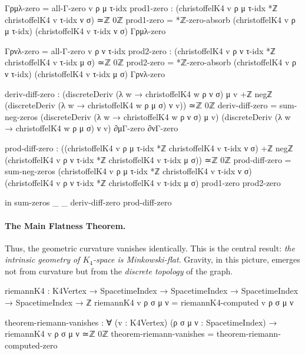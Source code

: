 \documentclass[11pt,a4paper]{book}
\begin{document}
\begin{code}
      Γρμλ-zero = all-Γ-zero v ρ μ τ-idx
      prod1-zero : (christoffelK4 v ρ μ τ-idx *ℤ christoffelK4 v τ-idx ν σ) ≃ℤ 0ℤ
      prod1-zero = *ℤ-zero-absorb (christoffelK4 v ρ μ τ-idx) 
                                   (christoffelK4 v τ-idx ν σ) Γρμλ-zero
      
      Γρνλ-zero = all-Γ-zero v ρ ν τ-idx
      prod2-zero : (christoffelK4 v ρ ν τ-idx *ℤ christoffelK4 v τ-idx μ σ) ≃ℤ 0ℤ
      prod2-zero = *ℤ-zero-absorb (christoffelK4 v ρ ν τ-idx)
                                   (christoffelK4 v τ-idx μ σ) Γρνλ-zero
      
      deriv-diff-zero : (discreteDeriv (λ w → christoffelK4 w ρ ν σ) μ v +ℤ 
                         negℤ (discreteDeriv (λ w → christoffelK4 w ρ μ σ) ν v)) ≃ℤ 0ℤ
      deriv-diff-zero = sum-neg-zeros 
                          (discreteDeriv (λ w → christoffelK4 w ρ ν σ) μ v)
                          (discreteDeriv (λ w → christoffelK4 w ρ μ σ) ν v)
                          ∂μΓ-zero ∂νΓ-zero
      
      prod-diff-zero : ((christoffelK4 v ρ μ τ-idx *ℤ christoffelK4 v τ-idx ν σ) +ℤ
                        negℤ (christoffelK4 v ρ ν τ-idx *ℤ christoffelK4 v τ-idx μ σ)) ≃ℤ 0ℤ
      prod-diff-zero = sum-neg-zeros
                         (christoffelK4 v ρ μ τ-idx *ℤ christoffelK4 v τ-idx ν σ)
                         (christoffelK4 v ρ ν τ-idx *ℤ christoffelK4 v τ-idx μ σ)
                         prod1-zero prod2-zero
      
  in sum-zeros _ _ deriv-diff-zero prod-diff-zero
\end{code}

\paragraph{The Main Flatness Theorem.}

Thus, the geometric curvature vanishes identically. This is the central result: \emph{the 
intrinsic geometry of $K_4$-space is Minkowski-flat}. Gravity, in this picture, emerges 
not from curvature but from the \emph{discrete topology} of the graph.

\begin{code}
riemannK4 : K4Vertex → SpacetimeIndex → SpacetimeIndex → 
            SpacetimeIndex → SpacetimeIndex → ℤ
riemannK4 v ρ σ μ ν = riemannK4-computed v ρ σ μ ν

theorem-riemann-vanishes : ∀ (v : K4Vertex) (ρ σ μ ν : SpacetimeIndex) →
  riemannK4 v ρ σ μ ν ≃ℤ 0ℤ
theorem-riemann-vanishes = theorem-riemann-computed-zero
\end{code}
\end{document}
